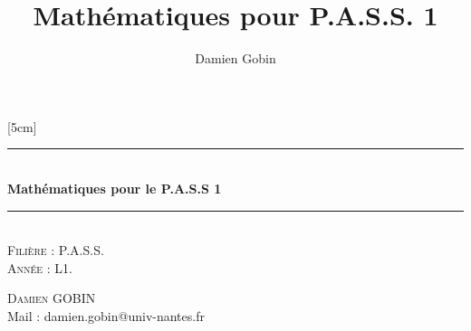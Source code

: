 \documentclass[a4paper, 11pt,openany]{book}%
\title{Mathématiques pour P.A.S.S. 1}
\author{Damien Gobin}
\newtheorem[L]{thm}{Théorème}[section]
\newtheorem[M]{propo}[thm]{Proposition}
\newtheorem[M]{prop}[thm]{Propriété}
\newtheorem[M]{coro}[thm]{Corollaire}
\newtheorem[M]{lem}[thm]{Lemme}
\newtheorem[M,bodystyle=]{defi}[thm]{Définition}
\newtheorem[M,bodystyle=]{remark}[thm]{Remarque}
\newtheorem[M,bodystyle=]{met}[thm]{Méthode}
\newtheorem[M,bodystyle=]{ret}[thm]{A retenir}
\newtheorem[M,bodystyle=]{idee}[thm]{Idée}
\newtheorem[style=S,underline=false,bodystyle=]{exem}[thm]{Exemple}
\newtheorem[S,underline=false,bodystyle=]{exo}[thm]{Exercice}
\newtheorem[S,underline=false,bodystyle=]{appli}[thm]{Application}
\newtheorem[S,underline=false,bodystyle=]{sol}[thm]{Solution}
\newtheorem[S,underline=false,bodystyle=]{hypo}[thm]{Hypothesis}
\newtheorem[S,underline=false,bodystyle=]{nota}[thm]{Notation}
\begin{document}
\begin{titlepage}

  \begin{sffamily}

  \begin{center}






 

    \hspace{5.7cm}



    [5cm]







    \rule{\linewidth}{0.5mm}\\[0.4cm]

    { \huge \bfseries Mathématiques pour le P.A.S.S 1\\[0.4cm] }



    \rule{\linewidth}{0.5mm}\\[4cm]

    



    \textsc{\Large Filière : P.A.S.S.}\\

    \textsc{\Large Année : L1.}\\    [5cm]

    

   


    \begin{minipage}{0.4\textwidth}

      \begin{flushleft} \large

        \textsc{Damien GOBIN}\\

        Mail : damien.gobin@univ-nantes.fr\\

      \end{flushleft}


\end{minipage}
\end{center}
\end{sffamily}
\end{titlepage}
\end{document}
